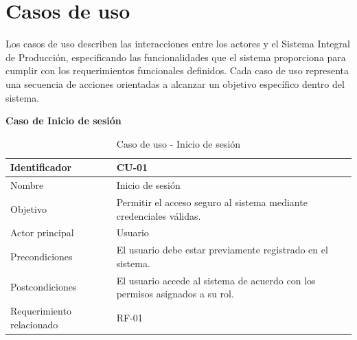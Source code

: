 
\section{Casos de uso}

Los casos de uso describen las interacciones entre los actores y el Sistema Integral de Producción, especificando las funcionalidades que el sistema proporciona para cumplir con los requerimientos funcionales definidos. Cada caso de uso representa una secuencia de acciones orientadas a alcanzar un objetivo específico dentro del sistema.


\textbf{Caso de Inicio de sesión}

\begin{table}[H]
    \centering
    \caption{Caso de uso - Inicio de sesión}
    \label{tab:cu01}
    \begin{tabularx}{\textwidth}{|X|X|}
        \hline
        Identificador             & CU-01                                                                        \\ \hline
        Nombre                    & Inicio de sesión                                                             \\ \hline
        Objetivo                  & Permitir el acceso seguro al sistema mediante credenciales válidas.          \\ \hline
        Actor principal           & Usuario                                                                      \\ \hline
        Precondiciones            & El usuario debe estar previamente registrado en el sistema.                  \\ \hline
        Postcondiciones           & El usuario accede al sistema de acuerdo con los permisos asignados a su rol. \\ \hline
        Requerimiento relacionado & RF-01                                                                        \\ \hline
    \end{tabularx}
\end{table}

